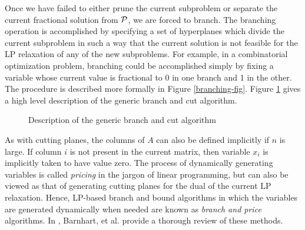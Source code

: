 \indent Once we have failed to either prune the current subproblem or separate
the current fractional solution from ${\cal P}$, we are forced to
branch. The branching operation is accomplished by specifying a set of
hyperplanes which divide the current subproblem in such a way that the
current solution is not feasible for the LP relaxation of any of the
new subproblems. For example, in a combinatorial optimization problem,
branching could be accomplished simply by fixing a variable whose
current value is fractional to 0 in one branch and 1
in the other. The procedure is described more formally in Figure
\ref{branching-fig}. Figure \ref{gb&c} gives a high level description
of the generic branch and cut algorithm.
\begin{figure}
\caption{Description of the generic branch and cut algorithm}
\label{gb&c}
\end{figure}

As with cutting planes, the columns of $A$ can also be defined
implicitly if $n$ is large. If column $i$ is not present in the
current matrix, then variable $x_i$ is implicitly taken to have value
zero. The process of dynamically generating variables is called {\em
pricing} in the jargon of linear programming, but can also be viewed
as that of generating cutting planes for the dual of the current
LP relaxation. Hence, LP-based branch and bound algorithms in which
the variables are generated dynamically when needed are known as {\em
branch and price} algorithms. In \cite{barn:branc}, Barnhart,
et al. provide a thorough review of these methods. 

